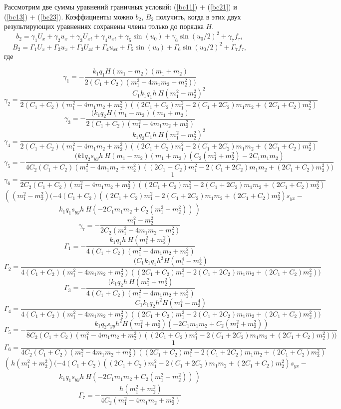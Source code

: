 Рассмотрим две суммы уравнений граничных условий: (\ref{bc11}) $+$ (\ref{bc21}) и (\ref{bc13}) $+$ (\ref{bc23}). Коэффициенты можно $b_2$, $B_2$ получить, когда в этих двух результирующих уравнениях сохранены члены только до порядка $H$.
\[
b_2=\gamma_1 U_x+ \gamma_2 u_x+ \gamma_3 U_{xt}+\gamma_4 u_{xt}+\gamma_5 \sin(u_0) +\gamma_6 \sin(u_0/2)^2+ \gamma_7 f_\tau,
\]
\[
B_2=\Gamma_1 U_x+ \Gamma_2 u_x+ \Gamma_{3} U_{xt}+\Gamma_{4} u_{xt}+\Gamma_{5} \sin(u_0) +\Gamma_{6} \sin(u_0/2)^2+ \Gamma_{7} f_\tau,
\]
где
\begin{small}
\[
\gamma_1=-\frac{ k_1 q_1 H (m_1 - m_2) (m_1 + m_2) }{2 (C_1 + C_2) (m_1^2 - 4 m_1 m_2 + m_2^2))}
\]
\[
\gamma_2=\frac{C_1  k_1 q_1  h ~H(m_1^2 - m_2^2)^2}{2 (C_1 + C_2) (m_1^2 - 4 m_1 m_2 + 
	m_2^2) ((2 C_1 + C_2) m_1^2 - 2 (C_1 + 2 C_2) m_1 m_2 + (2 C_1 + C_2) m_2^2)}
\]
\[
\gamma_3=   -\frac{(k_1  q_2 H(m_1 - m_2) (m_1 + m_2)}{2 (C_1 + C_2) (m_1^2 - 4 m_1 m_2 + m_2^2)}
\]
\[
\gamma_4=\frac{ k_1 q_2 C_1 h ~H(m_1^2 - m_2^2)^2 }{2 (C_1 + C_2) (m_1^2 - 4 m_1 m_2 + 
	m_2^2) ((2 C_1 + C_2) m_1^2 - 2 (C_1 + 2 C_2) m_1 m_2 + (2 C_1 + C_2) m_2^2)}
\]
\[
\gamma_5=-\frac{( k1  q_2 s_{yy} h ~H (m_1 - m_2) (m_1 + m_2) ( C_2 (m_1^2 + m_2^2)-2 C_1 m_1 m_2  
	)}{ 4 C_2 (C_1 + C_2) (m_1^2 - 4 m_1 m_2 + m_2^2) ((2 C_1 + C_2) m_1^2 - 2 (C_1 + 2 C_2) m_1 m_2 + (2 C_1 + C_2) m_2^2))}
\]
\[
\gamma_6=\frac{1} {2 C_2 (C_1 + 
	C_2) (m_1^2 - 4 m_1 m_2 + m_2^2) ((2 C_1 + C_2) m_1^2 - 
	2 (C_1 + 2 C_2) m_1 m_2 + (2 C_1 + C_2) m_2^2)}
\]
\[
\left(\frac{}{} (m_1^2 - m_2^2)  (-4 (C_1 + C_2) ((2 C_1 + C_2) m_1^2 - 
2 (C_1 + 2 C_2) m_1 m_2 + (2 C_1 + C_2) m_2^2) s_{yx} - \right.
\]
\[
\left.
k_1q_1 s_{yy} h~ H (-2 C_1 m_1 m_2 + C_2 (m_1^2 + m_2^2))\frac{}{} \right)
\]
\[
\gamma_7=-\frac{m_1^2 - m_2^2}{2 C_2 (m_1^2 - 4 m_1 m_2 + m_2^2)}
\]
\[
\Gamma_1=-\frac{ k_1 q_1 h~ H (m_1^2 + m_2^2) }{4 (C_1 + C_2) (m_1^2 - 4 m_1 m_2 + m_2^2)}
\]
\[
\Gamma_2=\frac{(C_1  k_1 q_1 h^2 H (m_1^4 - m_2^4) }{
	4 (C_1 + C_2) (m_1^2 - 4 m_1 m_2 + m_2^2) ((2 C_1 + C_2) m_1^2 - 
	2 (C_1 + 2 C_2) m_1 m_2 + (2 C_1 + C_2) m_2^2))}
\]
\[
\Gamma_{3}=-\frac{(k_1 q_2 h ~H (m_1^2 + m_2^2) }{4 (C_1 + C_2) (m_1^2 - 4 m_1 m_2 + m_2^2)}
\]
\[
\Gamma_{4}=\frac{C_1  k_1 q_2 h^2 H (m_1^4 - m_2^4) }{
	4 (C_1 + C_2) (m_1^2 - 4 m_1 m_2 + m_2^2) ((2 C_1 + C_2) m_1^2 - 
	2 (C_1 + 2 C_2) m_1 m_2 + (2 C_1 + C_2) m_2^2))}
\]
\[
\Gamma_{5}=-\frac{ k_1 q_2 s_{yy} h^2 H (m_1^2 + m_2^2) (-2 C_1 m_1 m_2 + C_2 (m_1^2 + m_2^2)) }{
	8 C_2 (C_1 + C_2) (m_1^2 - 4 m_1 m_2 + m_2^2) ((2 C_1 + C_2) m_1^2 - 
	2 (C_1 + 2 C_2) m_1 m_2 + (2 C_1 + C_2) m_2^2)))}
\]
\[
\Gamma_{6}=\frac{1}{4 C_2 (C_1 + 
	C_2) (m_1^2 - 4 m_1 m_2 + m_2^2) ((2 C_1 + C_2) m_1^2 - 
	2 (C_1 + 2 C_2) m_1 m_2 + (2 C_1 + C_2) m_2^2)}
\]
\[
\left(\frac{}{}  h (m_1^2 + m_2^2) (-4 (C_1 + C_2) ((2 C_1 + C_2) m_1^2 - 
2 (C_1 + 2 C_2) m_1 m_2 + (2 C_1 + C_2) m_2^2) s_{yx} - \right.
\]
\[
\left.    k_1 q_1 s_{yy} h ~H(-2 C_1 m_1 m_2 + C_2 (m_1^2 + m_2^2))\frac{}{} \right)
\]
\[
\Gamma_{7}=-\frac{h (m_1^2 + m_2^2)}{4 C_2 (m_1^2 - 4 m_1 m_2 + m_2^2)}
\]
\end{small}

